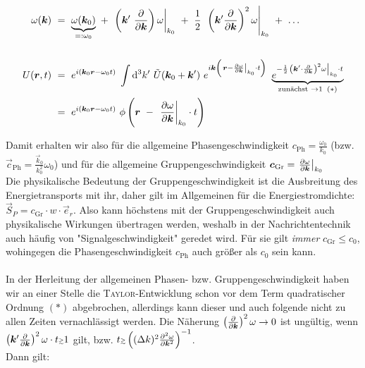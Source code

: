 \begin{align*}
\omega(\vec{k}) \ &= \ \underbrace{\omega(\vec{k}_0)}_{=:\omega_0} \ + \ \left.\left(\vec{k}' \ \pdiff{}{\vec{k}}\right)\omega\right|_{k_0} \ + \ \frac{1}{2} \ \left.\left(\vec{k}'\pdiff{}{\vec{k}}\right)^2\omega\right|_{k_0} \ + \ \ldots\\
\ \\
U(\vec{r},t)  \ &= \ e^{i(\vec{k}_0\vec{r}-\omega_0 t)} \; \int\d^3 k' \ \tilde{U}(\vec{k}_0 + \vec{k}') \ e^{i\vec{k}\left(\left.\vec{r}-\pdiff{\omega}{\vec{k}}\right|_{k_0} \cdot t\right)} \ \underbrace{e^{-\frac{1}{2}\left.\left(\vec{k}' \cdot \pdiff{}{\vec{k}}\right)^2\omega\right|_{k_0} \cdot t}}_{\text{zunächst } \rightarrow 1 \; \; (*)}\\
&= \ e^{i(\vec{k}_0\vec{r} - \omega_0 t)} \ \phi\left(\vec{r} \ - \ \left.\pdiff{\omega}{\vec{k}}\right|_{k_0} \cdot t \right)
\end{align*}

Damit erhalten wir also für die allgemeine Phasengeschwindigkeit $c_{\text{Ph}} = \frac{\omega_0}{k_0}$ (bzw. $\vec{c}_{\text{Ph}} = \frac{\vec{k}_0}{k_0^2}\omega_0$) und für die allgemeine Gruppengeschwindigkeit $\bm{c}_{\text{Gr}} = \left.\frac{\partial{\omega}}{\partial{\bm{k}}}\right|_{k_0}$\\
Die physikalische Bedeutung der Gruppengeschwindigkeit ist die Ausbreitung des Energietransports mit ihr, daher gilt im Allgemeinen für die Energiestromdichte: $\vec{S}_P = c_{\text{Gr}} \cdot w \cdot \vec{e}_r$. Also kann höchstens mit der Gruppengeschwindigkeit auch physikalische Wirkungen übertragen werden, weshalb in der Nachrichtentechnik auch häufig von "Signalgeschwindigkeit" geredet wird. Für sie gilt \emph{immer} $c_{\text{Gr}} \leq c_0$, wohingegen die Phasengeschwindigkeit $c_{\text{Ph}}$ auch größer als  $c_0$ sein kann.\\ 
\ \\
In der Herleitung der allgemeinen Phasen- bzw. Gruppengeschwindigkeit haben wir an einer Stelle die \textsc{Taylor}-Entwicklung schon vor dem Term quadratischer Ordnung $(*)$ abgebrochen, allerdings kann dieser und auch folgende nicht zu allen Zeiten vernachlässigt werden. Die Näherung \grqq{}$\left(\frac{\partial{}}{\partial{\bm{k}}}\right)^2\omega\rightarrow 0$\grqq{} ist ungültig, wenn $\left(\vec{k}'\pdiff{}{\vec{k}}\right)^2\omega \cdot t \mathsmaller{\mathsmaller{\gtrsim}} 1$ gilt, bzw. $t \mathsmaller{\mathsmaller{\gtrsim}} \left((\Delta k)^2 \pddiff{\omega}{\vec{k}}\right)^{-1}$.\\
Dann gilt:

